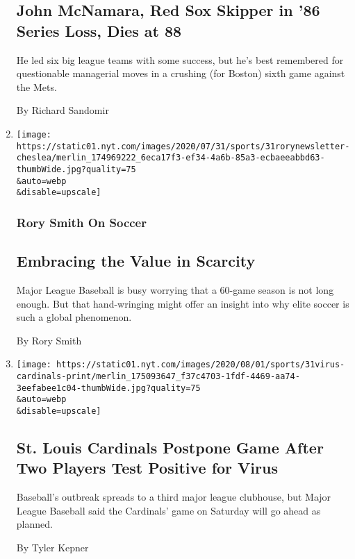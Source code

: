 \begin{enumerate}
{  \subsection{John McNamara, Red Sox Skipper in '86 Series Loss, Dies at
  88}\label{john-mcnamara-red-sox-skipper-in-86-series-loss-dies-at-88}}

  He led six big league teams with some success, but he's best
  remembered for questionable managerial moves in a crushing (for
  Boston) sixth game against the Mets.

  By Richard Sandomir
\item
  \href{/2020/07/31/sports/soccer/soccer-baseball.html}{}

  \texttt{[image: https://static01.nyt.com/images/2020/07/31/sports/31rorynewsletter-cheslea/merlin\_174969222\_6eca17f3-ef34-4a6b-85a3-ecbaeeabbd63-thumbWide.jpg?quality=75\\\&auto=webp\\\&disable=upscale]}

  \hypertarget{rory-smith-on-soccer}{%
  \subsubsection{Rory Smith On Soccer}\label{rory-smith-on-soccer}}

  \hypertarget{embracing-the-value-in-scarcity}{%
  \subsection{Embracing the Value in
  Scarcity}\label{embracing-the-value-in-scarcity}}

  Major League Baseball is busy worrying that a 60-game season is not
  long enough. But that hand-wringing might offer an insight into why
  elite soccer is such a global phenomenon.

  By Rory Smith
\item
  \href{/2020/07/31/sports/baseball/cardinals-twins-coronavirus-mlb.html}{}

  \texttt{[image: https://static01.nyt.com/images/2020/08/01/sports/31virus-cardinals-print/merlin\_175093647\_f37c4703-1fdf-4469-aa74-3eefabee1c04-thumbWide.jpg?quality=75\\\&auto=webp\\\&disable=upscale]}

  \hypertarget{st-louis-cardinals-postpone-game-after-two-players-test-positive-for-virus}{%
  \subsection{St. Louis Cardinals Postpone Game After Two Players Test
  Positive for
  Virus}\label{st-louis-cardinals-postpone-game-after-two-players-test-positive-for-virus}}

  Baseball's outbreak spreads to a third major league clubhouse, but
  Major League Baseball said the Cardinals' game on Saturday will go
  ahead as planned.

  By Tyler Kepner
\end{enumerate}

